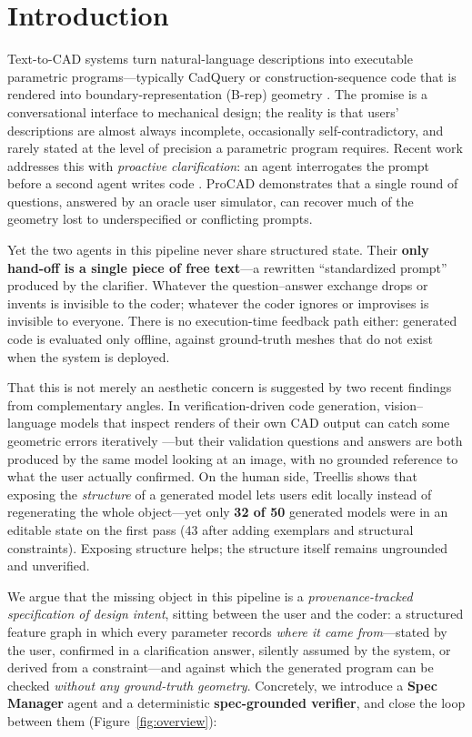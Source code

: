 \section{Introduction}\label{sec:intro}

Text-to-CAD systems turn natural-language descriptions into executable
parametric programs---typically CadQuery or construction-sequence code that is
rendered into boundary-representation (B-rep) geometry
\cite{deepcad,text2cad,llm4cad,cadrecode}. The promise is a conversational
interface to mechanical design; the reality is that users' descriptions are
almost always incomplete, occasionally self-contradictory, and rarely stated
at the level of precision a parametric program requires. Recent work addresses
this with \emph{proactive clarification}: an agent interrogates the prompt
before a second agent writes code \cite{procad}. ProCAD demonstrates that a
single round of questions, answered by an oracle user simulator, can recover
much of the geometry lost to underspecified or conflicting prompts.

Yet the two agents in this pipeline never share structured state. Their
\textbf{only hand-off is a single piece of free text}---a rewritten
``standardized prompt'' produced by the clarifier. Whatever the
question--answer exchange drops or invents is invisible to the coder;
whatever the coder ignores or improvises is invisible to everyone. There is
no execution-time feedback path either: generated code is evaluated only
offline, against ground-truth meshes that do not exist when the system is
deployed.

That this is not merely an aesthetic concern is suggested by two recent
findings from complementary angles. In verification-driven code generation,
vision--language models that inspect renders of their own CAD output can
catch some geometric errors iteratively \cite{cadcodeverify}---but their
validation questions and answers are both produced by the same model looking
at an image, with no grounded reference to what the user actually confirmed.
On the human side, Treellis \cite{treellis} shows that exposing the
\emph{structure} of a generated model lets users edit locally instead of
regenerating the whole object---yet only \textbf{32 of 50} generated models
were in an editable state on the first pass (43 after adding exemplars and
structural constraints). Exposing structure helps; the structure itself
remains ungrounded and unverified.

We argue that the missing object in this pipeline is a
\emph{provenance-tracked specification of design intent}, sitting between the
user and the coder: a structured feature graph in which every parameter
records \emph{where it came from}---stated by the user, confirmed in a
clarification answer, silently assumed by the system, or derived from a
constraint---and against which the generated program can be checked
\emph{without any ground-truth geometry}. Concretely, we introduce a
\textbf{Spec Manager} agent and a deterministic \textbf{spec-grounded
verifier}, and close the loop between them
(Figure~\ref{fig:overview}):

